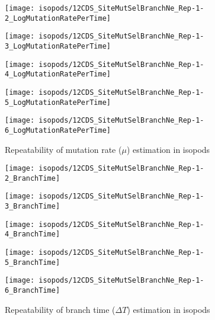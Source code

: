 \begin{figure}[H]
    \centering
    \begin{minipage}{0.32\linewidth}
        \texttt{[image: isopods/12CDS\_SiteMutSelBranchNe\_Rep-1-2\_LogMutationRatePerTime]}
    \end{minipage}    \hfill
    \begin{minipage}{0.32\linewidth}
        \texttt{[image: isopods/12CDS\_SiteMutSelBranchNe\_Rep-1-3\_LogMutationRatePerTime]}
    \end{minipage}    \hfill
    \begin{minipage}{0.32\linewidth}
        \texttt{[image: isopods/12CDS\_SiteMutSelBranchNe\_Rep-1-4\_LogMutationRatePerTime]}
    \end{minipage}
    \begin{minipage}{0.32\linewidth}
        \texttt{[image: isopods/12CDS\_SiteMutSelBranchNe\_Rep-1-5\_LogMutationRatePerTime]}
    \end{minipage}
    \begin{minipage}{0.32\linewidth}
        \texttt{[image: isopods/12CDS\_SiteMutSelBranchNe\_Rep-1-6\_LogMutationRatePerTime]}
    \end{minipage}
    \caption[Repeatability of $\mu$ estimation in isopods]{Repeatability of mutation rate ($\mu$) estimation in isopods}
\end{figure}

\begin{figure}[H]
    \centering
    \begin{minipage}{0.32\linewidth}
        \texttt{[image: isopods/12CDS\_SiteMutSelBranchNe\_Rep-1-2\_BranchTime]}
    \end{minipage}    \hfill
    \begin{minipage}{0.32\linewidth}
        \texttt{[image: isopods/12CDS\_SiteMutSelBranchNe\_Rep-1-3\_BranchTime]}
    \end{minipage}    \hfill
    \begin{minipage}{0.32\linewidth}
        \texttt{[image: isopods/12CDS\_SiteMutSelBranchNe\_Rep-1-4\_BranchTime]}
    \end{minipage}
    \begin{minipage}{0.32\linewidth}
        \texttt{[image: isopods/12CDS\_SiteMutSelBranchNe\_Rep-1-5\_BranchTime]}
    \end{minipage}
    \begin{minipage}{0.32\linewidth}
        \texttt{[image: isopods/12CDS\_SiteMutSelBranchNe\_Rep-1-6\_BranchTime]}
    \end{minipage}
    \caption[Repeatability of branch time estimation in isopods]{Repeatability of branch time ($\Delta T$) estimation in isopods}
\end{figure}

